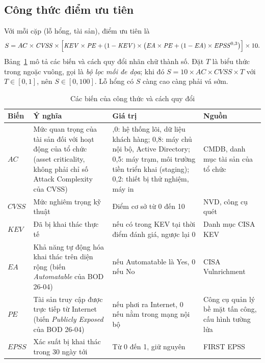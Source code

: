 \documentclass[runningheads]{llncs}
\begin{document}
\subsection{Công thức điểm ưu tiên}

Với mỗi cặp (lỗ hổng, tài sản), điểm ưu tiên là
\begin{equation}
S = AC \times \mathit{CVSS} \times \Bigl[\mathit{KEV} \times \mathit{PE} + (1-\mathit{KEV}) \times
\bigl(\mathit{EA} \times \mathit{PE} + (1-\mathit{EA}) \times \mathit{EPSS}^{0{,}3}\bigr)\Bigr] \times 10.
\label{eq:S}
\end{equation}
Bảng~\ref{tab:bien} mô tả các biến và cách quy đổi nhãn chữ thành số. Đặt $T$ là biểu thức trong ngoặc
vuông, gọi là \emph{bộ lọc mối đe dọa}; khi đó $S = 10 \times AC \times \mathit{CVSS} \times T$ với
$T \in [0, 1]$, nên $S \in [0, 100]$. Lỗ hổng có $S$ càng cao càng phải vá sớm.

\begin{table}
\centering
\caption{Các biến của công thức và cách quy đổi}\label{tab:bien}
\small
\begin{tabular}{>{\raggedright\arraybackslash}p{1.3cm}>{\raggedright\arraybackslash}p{4.0cm}>{\raggedright\arraybackslash}p{3.9cm}>{\raggedright\arraybackslash}p{2.7cm}}
\toprule
Biến & Ý nghĩa & Giá trị & Nguồn \\
\midrule
$AC$ & Mức quan trọng của tài sản đối với hoạt động của tổ chức (asset criticality, không phải chỉ số Attack Complexity của CVSS) & 1,0: hệ thống lõi, dữ liệu khách hàng; 0,8: máy chủ nội bộ, Active Directory; 0,5: máy trạm, môi trường tiền triển khai (staging); 0,2: thiết bị thử nghiệm, máy in & CMDB, danh mục tài sản của tổ chức \\
$\mathit{CVSS}$ & Mức nghiêm trọng kỹ thuật & Điểm cơ sở từ 0 đến 10 & NVD, công cụ quét \\
$\mathit{KEV}$ & Đã bị khai thác thực tế & 1 nếu có trong KEV tại thời điểm đánh giá, ngược lại 0 & Danh mục CISA KEV \\
$\mathit{EA}$ & Khả năng tự động hóa khai thác trên diện rộng (biến \emph{Automatable} của BOD 26-04) & 1 nếu Automatable là Yes, 0 nếu No & CISA Vulnrichment \\
$\mathit{PE}$ & Tài sản truy cập được trực tiếp từ Internet (biến \emph{Publicly Exposed} của BOD 26-04) & 1 nếu phơi ra Internet, 0 nếu nằm trong mạng nội bộ & Công cụ quản lý bề mặt tấn công, cấu hình tường lửa \\
$\mathit{EPSS}$ & Xác suất bị khai thác trong 30 ngày tới & Từ 0 đến 1, giữ nguyên & FIRST EPSS \\
\bottomrule
\end{tabular}
\end{table}
\end{document}
